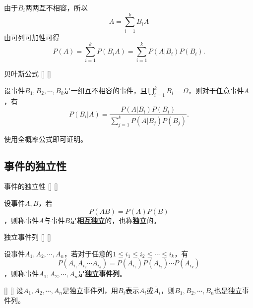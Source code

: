 \documentclass[UTF8]{ctexart}
\begin{document}
        \begin{prf}
            
            
            
            
            由于$B_i$两两互不相容，所以\[A=\sum_{i=1}^{k}B_iA\]
            由可列可加性可得\[P(A)=\sum_{i=1}^{k}P(B_iA)=\sum_{i=1}^{k}P(A|B_i)P(B_i).\]
        \end{prf}

        \begin{thm}
            []
            {贝叶斯公式}
            []
            []


            设事件$B_1,B_2,\cdots,B_k$是一组互不相容的事件，且$\bigcup_{i=1}^{k}B_i=\Omega$，则对于任意事件$A$，有\[P(B_i|A)=\frac{P(A|B_i)P(B_i)}{\sum_{j=1}^{k}P(A|B_j)P(B_j)}.\]
        \end{thm}

        \begin{prf}
            
            
            
            
            使用全概率公式即可证明。
        \end{prf}

    \subsection{事件的独立性}

        \begin{dfn}
            []
            {事件的独立性}
            []
            []


            设事件$A,B$，若\[P(AB)=P(A)P(B)\]，则称事件$A$与事件$B$是\textbf{相互独立}的，也称\textbf{独立}的。
        \end{dfn}

        \begin{dfn}
            []
            {独立事件列}
            []
            []


            设事件$A_1,A_2,\cdots,A_n$，若对于任意的$1\leq i_1\leq i_2\leq\cdots\leq i_k$，有\[P(A_{i_1}A_{i_2}\cdots A_{i_k})=P(A_{i_1})P(A_{i_2})\cdots P(A_{i_k})\]，则称事件$A_1,A_2,\cdots,A_n$是\textbf{独立事件列}。
        \end{dfn}

        \begin{ppt}
            []
            {}
            []
            []
            设$A_1,A_2,\cdots,A_n$是独立事件列，用$B_i$表示$A_i$或$\bar{A}_i$，则$B_1,B_2,\cdots,B_n$也是独立事件列。
        \end{ppt}
\end{document}
